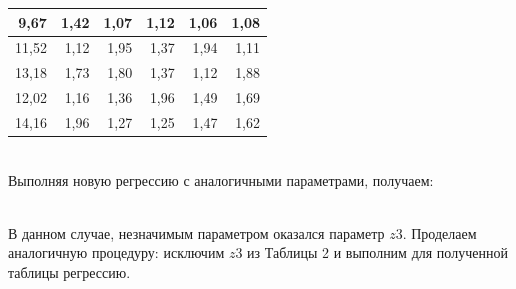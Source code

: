 \documentclass[14pt,a4paper]{scrartcl}
\begin{document}
\begin{table}[htbp]
{\begin{tabular}{|rrrrrr|}
		\hline
		9,67  & 1,42  & 1,07  & 1,12  & 1,06  & 1,08 \bigstrut\\
		\hline
		\rowcolor[rgb]{ .867,  .922,  .969} 11,52 & 1,12  & 1,95  & 1,37  & 1,94  & 1,11 \bigstrut\\
		\hline
		13,18 & 1,73  & 1,80  & 1,37  & 1,12  & 1,88 \bigstrut\\
		\hline
		\rowcolor[rgb]{ .867,  .922,  .969} 12,02 & 1,16  & 1,36  & 1,96  & 1,49  & 1,69 \bigstrut\\
		\hline
		14,16 & 1,96  & 1,27  & 1,25  & 1,47  & 1,62 \bigstrut\\
		\hline
	\end{tabular}}%
	\label{tab:addlabel2}%
\end{table}%
\\
Выполняя новую регрессию с аналогичными параметрами, получаем:
\begin{figure}[h]
\end{figure}
\\
В данном случае, незначимым параметром оказался параметр $z3$. Проделаем аналогичную процедуру: исключим $z3$ из Таблицы 2 и выполним для полученной таблицы регрессию.
\newpage
\end{document}
